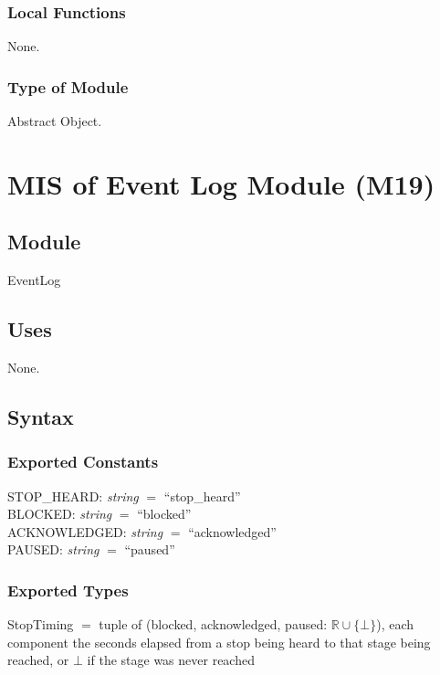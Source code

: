 \documentclass[12pt, titlepage]{article}
\newcommand{\str}{\textit{string}}
\newcommand{\R}{\mathbb{R}}
\newcommand{\nil}{\bot}
\begin{document}
\subsubsection{Local Functions}

None.

\subsubsection{Type of Module}

Abstract Object.

\newpage

\section{MIS of Event Log Module (M19)} \label{mod:log}

\subsection{Module}

EventLog

\subsection{Uses}

None.

\subsection{Syntax}

\subsubsection{Exported Constants}

\noindent STOP\_HEARD: \str{} $=$ ``stop\_heard''\\[2pt]
BLOCKED: \str{} $=$ ``blocked''\\[2pt]
ACKNOWLEDGED: \str{} $=$ ``acknowledged''\\[2pt]
PAUSED: \str{} $=$ ``paused''

\subsubsection{Exported Types}

StopTiming $=$ tuple of (blocked, acknowledged, paused: $\R \cup \{\nil\}$),
each component the seconds elapsed from a stop being heard to that stage being
reached, or $\nil$ if the stage was never reached
\end{document}
